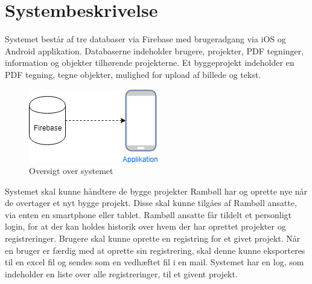 \chapter{Systembeskrivelse}
	Systemet består af tre databaser via Firebase med brugeradgang via iOS og Android applikation.
	Databaserne indeholder brugere, projekter, PDF tegninger, information og objekter tilhørende projekterne.
	Et byggeprojekt indeholder en PDF tegning, tegne objekter, mulighed for upload af billede og tekst. \\
	
	\begin{figure}[H]
		\centering
		\includegraphics[width=0.4\linewidth]{Systembeskrivelse/Oversigtoversystem}
		\caption{Oversigt over systemet}
		\label{fig:OversigtSystembeskrivelse}
	\end{figure}
	
	Systemet skal kunne håndtere de bygge projekter Rambøll har og oprette nye når de overtager et nyt bygge projekt.
	Disse skal kunne tilgåes af Rambøll ansatte, via enten en smartphone eller tablet.
	Rambøll ansatte får tildelt et personligt login, for at der kan holdes historik over hvem der har oprettet projekter og registreringer.
	Brugere skal kunne oprette en registring for et givet projekt.
	Når en bruger er færdig med at oprette sin registrering, skal denne kunne eksporteres til en excel fil og sendes som en vedhæftet fil i en mail.
	Systemet har en log, som indeholder en liste over alle registreringer, til et givent projekt. \\	
				 
	\clearpage